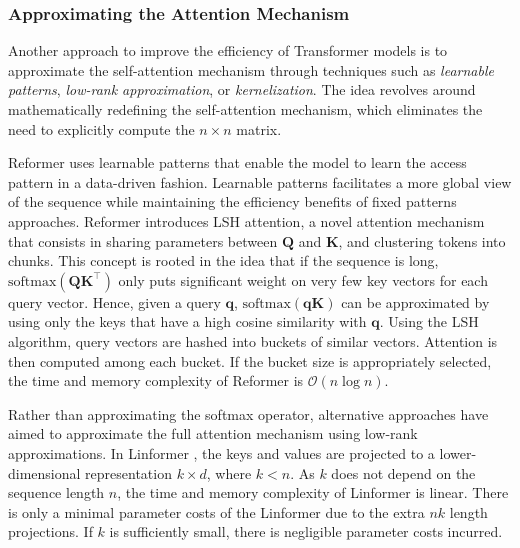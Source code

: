 \subsubsection{Approximating the Attention Mechanism}
\label{subsubsection:related-long-range-modeling-approx}

Another approach to improve the efficiency of Transformer models is to approximate the self-attention mechanism through techniques such as \textit{learnable patterns}, \textit{low-rank approximation}, or \textit{kernelization}. The idea revolves around mathematically redefining the self-attention mechanism, which eliminates the need to explicitly compute the $n \times n$ matrix.

Reformer \citep{kitaev2020reformer} uses learnable patterns that enable the model to learn the access pattern in a data-driven fashion. Learnable patterns facilitates a more global view of the sequence while maintaining the efficiency benefits of fixed patterns approaches. Reformer introduces \ac{LSH} attention, a novel attention mechanism that consists in sharing parameters between $\bm{Q}$ and $\bm{K}$, and clustering tokens into chunks. This concept is rooted in the idea that if the sequence is long, $\text{softmax}(\bm{Q}\bm{K}^{\top})$ only puts significant weight on very few key vectors for each query vector. Hence, given a query $\bm{q}$, $\text{softmax}(\bm{qK})$ can be approximated by using only the keys that have a high cosine similarity with $\bm{q}$. Using the \ac{LSH} algorithm, query vectors are hashed into buckets of similar vectors. Attention is then computed among each bucket. If the bucket size is appropriately selected, the time and memory complexity of Reformer is $\mathcal{O}(n \log n)$. 

Rather than approximating the softmax operator, alternative approaches have aimed to approximate the full attention mechanism using low-rank approximations. In Linformer \citep{wang2020linformer}, the keys and values are projected to a lower-dimensional representation $k \times d$, where $k < n$. As $k$ does not depend on the sequence length $n$, the time and memory complexity of Linformer is linear. There is only a minimal parameter costs of the Linformer due to the extra $nk$ length projections. If $k$ is sufficiently small, there is negligible parameter costs incurred. 

